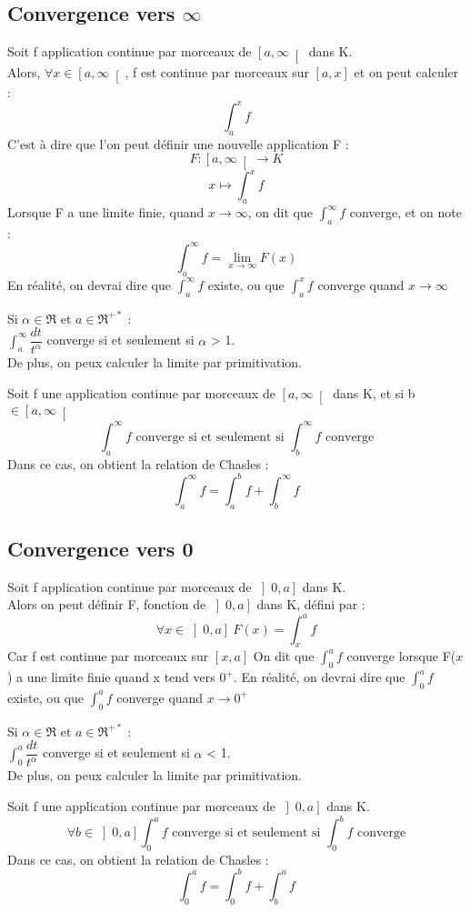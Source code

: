 \subsection{Convergence vers $\infty$}
\begin{de}
Soit f application continue par morceaux de $\left[a,\infty\right[$ dans K.\\
Alors, $\forall x \in \left[a,\infty\right[$, f est continue par morceaux sur $\left[a,x\right]$ et on peut calculer :
$$\int_a^x f$$
C'est à dire que l'on peut définir une nouvelle application F :
$$F : \left[a,\infty\right[ \rightarrow K$$
$$x \mapsto \int_a^x f$$
Lorsque F a une limite finie, quand $x \rightarrow \infty$, on dit que $\int_a^{\infty} f$ converge, et on note : 
$$\int_a^{\infty} f = \lim_{x \rightarrow \infty} F(x)$$
En réalité, on devrai dire que $\int_a^{\infty} f$ existe, ou que $\int_a^x f$ converge quand $x \rightarrow \infty$
\end{de}
\begin{prop}
Si $\alpha \in \Re$ et $a \in \Re^{+*}$ :\\
$\int_a^{\infty} \dfrac{dt}{t^{\alpha}}$ converge si et seulement si $\alpha$ > 1.\\
De plus, on peux calculer la limite par primitivation. 
\end{prop}
\begin{prop}
Soit f une application continue par morceaux de $\left[a,\infty\right[ $ dans K, et si b $\in \left[a,\infty\right[ $
$$\int_a^{\infty} f \mbox{ converge si et seulement si } \int_b^{\infty} f \mbox{ converge}$$
Dans ce cas, on obtient la relation de Chasles : 
$$\int_a^{\infty} f = \int_a^b f + \int_b^{\infty} f$$
\end{prop}
\subsection{Convergence vers 0}
\begin{de}
Soit f application continue par morceaux de $\left]0,a\right]$ dans K.\\
Alors on peut définir F, fonction de $\left]0,a\right]$ dans K, défini par :
$$\forall x \in \left]0,a\right]~ F(x)=\int_x^a f$$
Car f est continue par morceaux sur $\left[ x,a\right]$
On dit que $\int_0^a f$ converge lorsque F($x$) a une limite finie quand x tend vers $0^+$.
En réalité, on devrai dire que $\int_0^{a} f$ existe, ou que $\int_0^a f$ converge quand $x \rightarrow 0^+$
\end{de}
\begin{prop}
Si $\alpha \in \Re$ et $a \in \Re^{+*}$ :\\
$\int_0^a \dfrac{dt}{t^{\alpha}}$ converge si et seulement si $\alpha$ < 1.\\
De plus, on peux calculer la limite par primitivation. 
\end{prop}
\begin{prop}
Soit f une application continue par morceaux de $\left]0,a\right] $ dans K.
$$\forall b \in \left]0,a\right] \int_0^a f \mbox{ converge si et seulement si } \int_0^b f \mbox{ converge}$$
Dans ce cas, on obtient la relation de Chasles : 
$$\int_0^a f = \int_0^b f + \int_b^a f$$
\end{prop}
